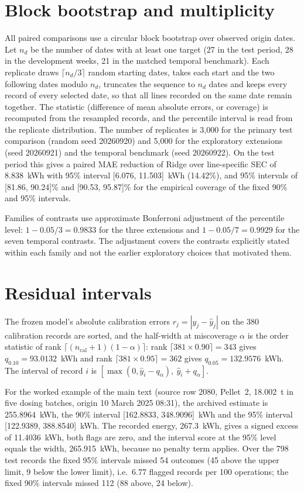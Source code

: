 \documentclass[11pt,a4paper]{article}
\begin{document}
\section{Block bootstrap and multiplicity}\label{sec:boot}
All paired comparisons use a circular block bootstrap over observed origin dates. Let $n_d$ be the number of dates with at least one target (27 in the test period, 28 in the development weeks, 21 in the matched temporal benchmark). Each replicate draws $\lceil n_d/3\rceil$ random starting dates, takes each start and the two following dates modulo $n_d$, truncates the sequence to $n_d$ dates and keeps every record of every selected date, so that all lines recorded on the same date remain together. The statistic (difference of mean absolute errors, or coverage) is recomputed from the resampled records, and the percentile interval is read from the replicate distribution. The number of replicates is 3,000 for the primary test comparison (random seed 20260920) and 5,000 for the exploratory extensions (seed 20260921) and the temporal benchmark (seed 20260922). On the test period this gives a paired MAE reduction of Ridge over line-specific SEC of 8.838~kWh with 95\% interval [6.076, 11.503]~kWh (14.42\%), and 95\% intervals of [81.86, 90.24]\% and [90.53, 95.87]\% for the empirical coverage of the fixed 90\% and 95\% intervals.

Families of contrasts use approximate Bonferroni adjustment of the percentile level: $1-0.05/3=0.9833$ for the three extensions and $1-0.05/7=0.9929$ for the seven temporal contrasts. The adjustment covers the contrasts explicitly stated within each family and not the earlier exploratory choices that motivated them.

\section{Residual intervals}\label{sec:intervals}
The frozen model's absolute calibration errors $r_j=|y_j-\widehat y_j|$ on the 380 calibration records are sorted, and the half-width at miscoverage $\alpha$ is the order statistic of rank $\lceil(n_{\mathrm{cal}}+1)(1-\alpha)\rceil$: rank $\lceil381\times0.90\rceil=343$ gives $q_{0.10}=93.0132$~kWh and rank $\lceil381\times0.95\rceil=362$ gives $q_{0.05}=132.9576$~kWh. The interval of record $i$ is $[\max(0,\widehat y_i-q_\alpha),\ \widehat y_i+q_\alpha]$.

For the worked example of the main text (source row 2080, Pellet~2, 18.002~t in five dosing batches, origin 10 March 2025 08:31), the archived estimate is 255.8964~kWh, the 90\% interval [162.8833, 348.9096]~kWh and the 95\% interval [122.9389, 388.8540]~kWh. The recorded energy, 267.3~kWh, gives a signed excess of 11.4036~kWh, both flags are zero, and the interval score at the 95\% level equals the width, 265.915~kWh, because no penalty term applies. Over the 798 test records the fixed 95\% intervals missed 54 outcomes (45 above the upper limit, 9 below the lower limit), i.e.\ 6.77 flagged records per 100 operations; the fixed 90\% intervals missed 112 (88 above, 24 below).
\end{document}
